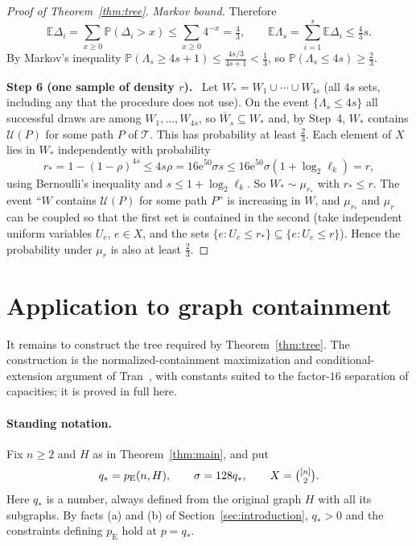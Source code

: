 \documentclass[11pt]{article}
\numberwithin{equation}{section}
\newcommand{\PP}{\mathbb P}
\newcommand{\EE}{\mathbb E}
\newcommand{\pE}{p_{\mathrm E}}
\newcommand{\TT}{\mathcal T}
\newcommand{\UU}{\mathcal U}
\newcommand{\ee}{\mathrm e}
\newcommand{\qs}{q_*}
\newcommand{\step}[2]{\par\medskip\noindent\textbf{Step #1 (#2).}\ }
\begin{document}
\begin{proof}[Proof of Theorem~\ref{thm:tree}]
\emph{Markov bound.} Therefore
\[
 \EE\Delta_i=\sum_{x\ge0}\PP(\Delta_i>x)\le\sum_{x\ge0}4^{-x}=\tfrac43,
 \qquad
 \EE\Lambda_s=\sum_{i=1}^s\EE\Delta_i\le\tfrac43s .
\]
By Markov's inequality
$\PP(\Lambda_s\ge4s+1)\le\frac{4s/3}{4s+1}<\frac13$, so
$\PP(\Lambda_s\le4s)\ge\frac23$.

\step{6}{one sample of density $r$}
Let $W_*=W_1\cup\cdots\cup W_{4s}$ (all $4s$ sets, including any that
the procedure does not use). On the event $\{\Lambda_s\le4s\}$
all successful draws are among $W_1,\ldots,W_{4s}$, so
$\overline W_s\subseteq W_*$ and, by Step~4, $W_*$ contains $\UU(P)$
for some path $P$ of $\TT$. This has probability at least $\frac23$.
Each element of $X$ lies in $W_*$ independently with probability
\[
 r_*=1-(1-\rho)^{4s}
 \le4s\rho
 =16\ee^{50}\sigma s
 \le16\ee^{50}\sigma(1+\log_2\ell_k)=r,
\]
using Bernoulli's inequality and
$s\le1+\log_2\ell_k$. So $W_*\sim\mu_{r_*}$ with $r_*\le r$. The event
``$W$ contains $\UU(P)$ for some path $P$'' is increasing in $W$, and
$\mu_{r_*}$ and $\mu_r$ can be coupled so that the first set is
contained in the second (take independent uniform variables $U_e$,
$e\in X$, and the sets $\{e:U_e\le r_*\}\subseteq\{e:U_e\le r\}$). Hence
the probability under $\mu_r$ is also at least $\frac23$.
\end{proof}

\section{Application to graph containment}\label{sec:graphs}

It remains to construct the tree required by Theorem~\ref{thm:tree}.
The construction is the normalized-containment maximization and
conditional-extension argument of
Tran~\cite[Section~3, Lemma~3.1]{Tran26}, with constants suited to the
factor-$16$ separation of capacities; it is proved in full here.

\paragraph{Standing notation.}
Fix $n\ge2$ and $H$ as in Theorem~\ref{thm:main}, and put
\[
 \qs=\pE(n,H),\qquad\sigma=128\qs,\qquad X=\tbinom{[n]}2 .
\]
Here $\qs$ is a number, always defined from the original graph $H$ with
all its subgraphs. By facts (a) and (b) of
Section~\ref{sec:introduction}, $\qs>0$ and the constraints defining
$\pE$ hold at $p=\qs$.
\end{document}
